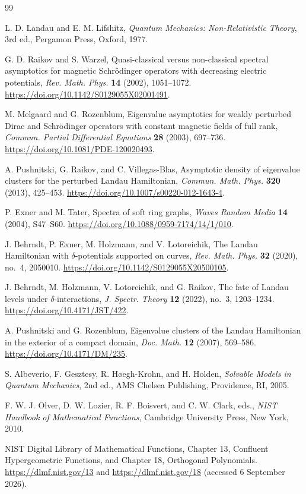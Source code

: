 \documentclass[12pt,a4paper]{article}
\numberwithin{equation}{section}
\theoremstyle{remark}
\theoremstyle{definition}
\begin{document}
\begin{thebibliography}{99}

L. D. Landau and E. M. Lifshitz,
\textit{Quantum Mechanics: Non-Relativistic Theory},
3rd ed., Pergamon Press, Oxford, 1977.

G. D. Raikov and S. Warzel,
Quasi-classical versus non-classical spectral asymptotics for magnetic
Schr\"odinger operators with decreasing electric potentials,
\textit{Rev. Math. Phys.} {\bfseries 14} (2002), 1051--1072.
\url{https://doi.org/10.1142/S0129055X02001491}.

M. Melgaard and G. Rozenblum,
Eigenvalue asymptotics for weakly perturbed Dirac and Schr\"odinger operators
with constant magnetic fields of full rank,
\textit{Commun. Partial Differential Equations} {\bfseries 28} (2003), 697--736.
\url{https://doi.org/10.1081/PDE-120020493}.

A. Pushnitski, G. Raikov, and C. Villegas-Blas,
Asymptotic density of eigenvalue clusters for the perturbed Landau Hamiltonian,
\textit{Commun. Math. Phys.} {\bfseries 320} (2013), 425--453.
\url{https://doi.org/10.1007/s00220-012-1643-4}.

P. Exner and M. Tater,
Spectra of soft ring graphs,
\textit{Waves Random Media} {\bfseries 14} (2004), S47--S60.
\url{https://doi.org/10.1088/0959-7174/14/1/010}.

J. Behrndt, P. Exner, M. Holzmann, and V. Lotoreichik,
The Landau Hamiltonian with $\delta$-potentials supported on curves,
\textit{Rev. Math. Phys.} {\bfseries 32} (2020), no.~4, 2050010.
\url{https://doi.org/10.1142/S0129055X20500105}.

J. Behrndt, M. Holzmann, V. Lotoreichik, and G. Raikov,
The fate of Landau levels under $\delta$-interactions,
\textit{J. Spectr. Theory} {\bfseries 12} (2022), no.~3, 1203--1234.
\url{https://doi.org/10.4171/JST/422}.

A. Pushnitski and G. Rozenblum,
Eigenvalue clusters of the Landau Hamiltonian in the exterior of a compact domain,
\textit{Doc. Math.} {\bfseries 12} (2007), 569--586.
\url{https://doi.org/10.4171/DM/235}.

S. Albeverio, F. Gesztesy, R. H\o egh-Krohn, and H. Holden,
\textit{Solvable Models in Quantum Mechanics}, 2nd ed.,
AMS Chelsea Publishing, Providence, RI, 2005.

F. W. J. Olver, D. W. Lozier, R. F. Boisvert, and C. W. Clark, eds.,
\textit{NIST Handbook of Mathematical Functions},
Cambridge University Press, New York, 2010.

NIST Digital Library of Mathematical Functions,
Chapter 13, Confluent Hypergeometric Functions, and Chapter 18,
Orthogonal Polynomials.
\url{https://dlmf.nist.gov/13} and \url{https://dlmf.nist.gov/18}
(accessed 6 September 2026).

\end{thebibliography}
\end{document}
